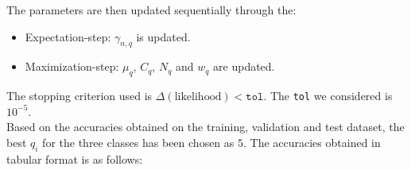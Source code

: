 \documentclass[11pt,a4paper]{article}
\newcommand{\noi}{\noindent}
\def\tt#1{\texttt{#1}}
\begin{document}
\noi
The parameters are then updated sequentially through the:
\begin{itemize}
    \itemsep0em
    \item Expectation-step: $\gamma_{n,q}$ is updated.
    \item Maximization-step: $\mu_q$, $C_q$, $N_q$ and $w_q$ are updated.
\end{itemize}

\noi
The stopping criterion used is $\Delta(\text{likelihood})<\tt{tol}$. The \tt{tol} we considered is $10^{-5}$.\\

\noi
Based on the accuracies obtained on the training, validation and test dataset, the best $q_i$ for the three classes has been chosen as $5$. The accuracies obtained in tabular format is as follows:

\end{document}
